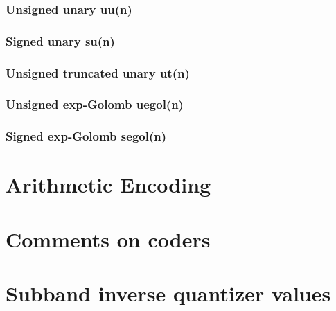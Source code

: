 \subsubsection{Unsigned unary uu(n)}
\subsubsection{Signed unary su(n)}
\subsubsection{Unsigned truncated unary ut(n)}
\subsubsection{Unsigned exp-Golomb uegol(n)}
\subsubsection{Signed exp-Golomb segol(n)}








\appendix
\section{Arithmetic Encoding}
\section{Comments on coders}
\section{Subband inverse quantizer values}
\clearpage
